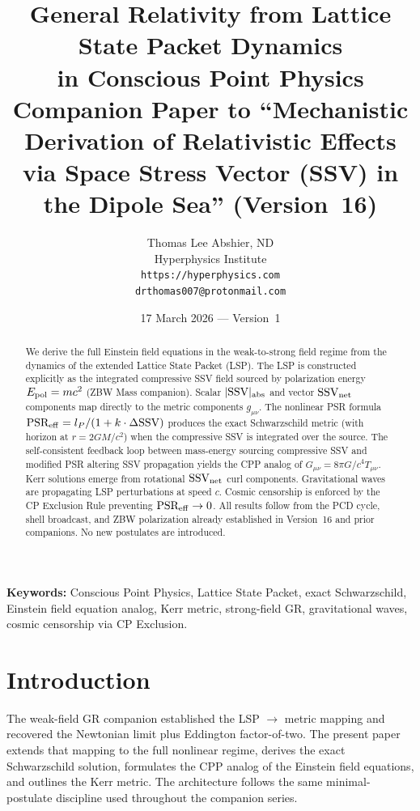 \documentclass[12pt]{article}
\title{\textbf{General Relativity from Lattice State Packet Dynamics\\
in Conscious Point Physics}\\[6pt]
{\large Companion Paper to ``Mechanistic Derivation of Relativistic Effects\\
via Space Stress Vector (SSV) in the Dipole Sea'' (Version~16)}}
\author{Thomas Lee Abshier, ND\\
Hyperphysics Institute\\
\texttt{https://hyperphysics.com}\\
\texttt{drthomas007@protonmail.com}}
\date{17 March 2026 --- Version~1}
\newcommand{\SSV}{\text{SSV}}
\begin{document}
\maketitle

\noindent\textbf{Keywords:} Conscious Point Physics, Lattice State Packet, exact Schwarzschild, Einstein field equation analog, Kerr metric, strong-field GR, gravitational waves, cosmic censorship via CP Exclusion.

\begin{abstract}
We derive the full Einstein field equations in the weak-to-strong field regime from the dynamics of the extended Lattice State Packet (LSP). The LSP is constructed explicitly as the integrated compressive SSV field sourced by polarization energy \(E_{\rm pol} = mc^2\) (ZBW Mass companion). Scalar \(|\SSV|_{\rm abs}\) and vector \(\SSV_{\rm net}\) components map directly to the metric components \(g_{\mu\nu}\). The nonlinear PSR formula \(\text{PSR}_{\rm eff} = l_P/(1 + k \cdot \Delta\SSV)\) produces the exact Schwarzschild metric (with horizon at \(r = 2GM/c^2\)) when the compressive SSV is integrated over the source. The self-consistent feedback loop between mass-energy sourcing compressive SSV and modified PSR altering SSV propagation yields the CPP analog of \(G_{\mu\nu} = 8\pi G/c^4 T_{\mu\nu}\). Kerr solutions emerge from rotational \(\SSV_{\rm net}\) curl components. Gravitational waves are propagating LSP perturbations at speed \(c\). Cosmic censorship is enforced by the CP Exclusion Rule preventing \(\text{PSR}_{\rm eff} \to 0\). All results follow from the PCD cycle, shell broadcast, and ZBW polarization already established in Version~16 and prior companions. No new postulates are introduced.
\end{abstract}

\section{Introduction}
The weak-field GR companion established the LSP \(\to\) metric mapping and recovered the Newtonian limit plus Eddington factor-of-two. The present paper extends that mapping to the full nonlinear regime, derives the exact Schwarzschild solution, formulates the CPP analog of the Einstein field equations, and outlines the Kerr metric. The architecture follows the same minimal-postulate discipline used throughout the companion series.
\end{document}
